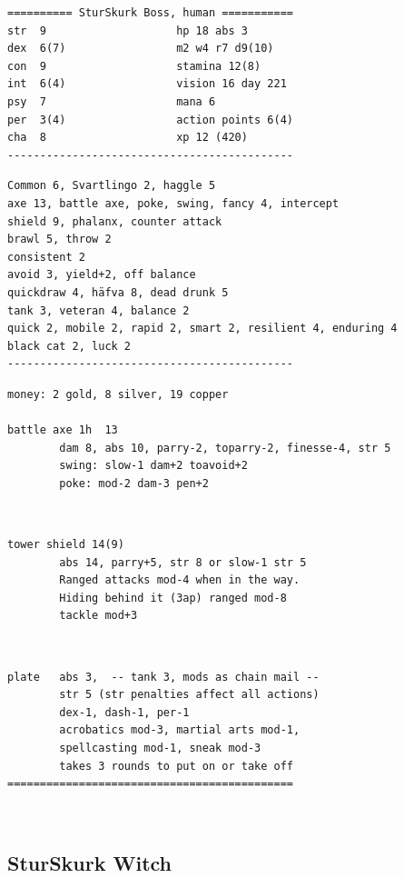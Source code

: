 \goodbreak \small \begin{samepage} \begin{verbatim}
========== SturSkurk Boss, human ===========
str  9                    hp 18 abs 3
dex  6(7)                 m2 w4 r7 d9(10)
con  9                    stamina 12(8)
int  6(4)                 vision 16 day 221
psy  7                    mana 6
per  3(4)                 action points 6(4)
cha  8                    xp 12 (420)
--------------------------------------------
\end{verbatim} \goodbreak \begin{verbatim}
Common 6, Svartlingo 2, haggle 5
axe 13, battle axe, poke, swing, fancy 4, intercept
shield 9, phalanx, counter attack
brawl 5, throw 2
consistent 2
avoid 3, yield+2, off balance
quickdraw 4, häfva 8, dead drunk 5
tank 3, veteran 4, balance 2
quick 2, mobile 2, rapid 2, smart 2, resilient 4, enduring 4
black cat 2, luck 2
--------------------------------------------
\end{verbatim} \goodbreak \begin{verbatim}
money: 2 gold, 8 silver, 19 copper

battle axe 1h  13
        dam 8, abs 10, parry-2, toparry-2, finesse-4, str 5
        swing: slow-1 dam+2 toavoid+2
        poke: mod-2 dam-3 pen+2
\end{verbatim} \begin{samepage}   \   \goodbreak \end{samepage} \begin{verbatim}
tower shield 14(9)
        abs 14, parry+5, str 8 or slow-1 str 5
        Ranged attacks mod-4 when in the way.
        Hiding behind it (3ap) ranged mod-8
        tackle mod+3
\end{verbatim} \begin{samepage}   \   \goodbreak \end{samepage} \begin{verbatim}
plate   abs 3,  -- tank 3, mods as chain mail --
        str 5 (str penalties affect all actions)
        dex-1, dash-1, per-1
        acrobatics mod-3, martial arts mod-1, 
        spellcasting mod-1, sneak mod-3
        takes 3 rounds to put on or take off
============================================
\end{verbatim} \end{samepage} \normalsize

\


\subsection*{SturSkurk Witch}

